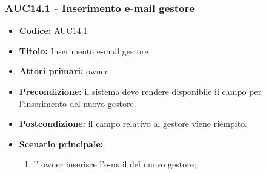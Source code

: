 \documentclass[casi-duso]{subfiles}
\begin{document}
\subsubsection{AUC14.1 - Inserimento e-mail gestore}%
\label{subsub:AUC14.1}
\begin{itemize}
  \item \textbf{Codice:} AUC14.1
  \item \textbf{Titolo:} Inserimento e-mail gestore
  \item \textbf{Attori primari:} owner
  \item \textbf{Precondizione:} il sistema deve rendere disponibile il campo per l'inserimento del nuovo gestore.
  \item \textbf{Postcondizione:} il campo relativo al gestore viene riempito.
  \item \textbf{Scenario principale:} 
  \begin{enumerate}
    \item l' owner inserisce l'e-mail del nuovo gestore;
  \end{enumerate}
\end{itemize}



\end{document}
